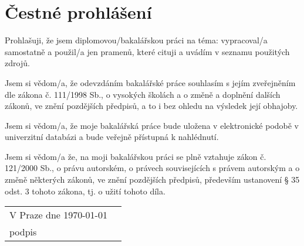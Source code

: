\vspace*{\fill}
\section*{Čestné prohlášení}
Prohlašuji, že jsem diplomovou/bakalářskou práci na téma: \nazev vypracoval/a samostatně a použil/a jen pramenů, které cituji a uvádím v seznamu použitých zdrojů.

Jsem si vědom/a, že odevzdáním bakalářské práce souhlasím s jejím zveřejněním dle zákona č. 111/1998 Sb., o vysokých školách a o změně a doplnění dalších zákonů, ve znění pozdějších předpisů, a to i bez ohledu na výsledek její obhajoby.

Jsem si vědom/a, že moje bakalářská práce bude uložena v elektronické podobě v univerzitní databázi a bude veřejně přístupná k nahlédnutí.

Jsem si vědom/a že, na moji bakalářskou práci se plně vztahuje zákon č. 121/2000 Sb., o právu autorském, o právech souvisejících s právem autorským a o změně některých zákonů, ve znění pozdějších předpisů, především ustanovení § 35 odst. 3 tohoto zákona, tj. o užití tohoto díla.

\qquad

\setlength{\dashlinedash}{1pt}
\setlength{\dashlinegap}{1pt}
\setlength{\arrayrulewidth}{1pt}

\noindent
\begin{tabularx}{\textwidth}{X r}
V Praze dne \today &
\begin{tabular}[b]{@{} p{6cm} @{}}
\\
\hdashline
\centering
podpis
\end{tabular}
\\
\end{tabularx}
